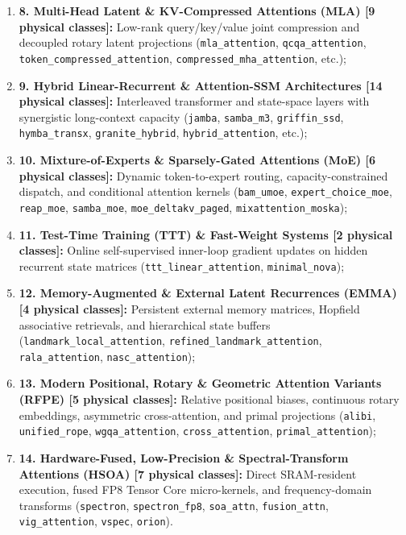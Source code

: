 \begin{enumerate}
    \item \textbf{8. Multi-Head Latent \& KV-Compressed Attentions (MLA) [9 physical classes]:} Low-rank query/key/value joint compression and decoupled rotary latent projections (\texttt{mla\_attention}, \texttt{qcqa\_attention}, \texttt{token\_compressed\_attention}, \texttt{compressed\_mha\_attention}, etc.);
    \item \textbf{9. Hybrid Linear-Recurrent \& Attention-SSM Architectures [14 physical classes]:} Interleaved transformer and state-space layers with synergistic long-context capacity (\texttt{jamba}, \texttt{samba\_m3}, \texttt{griffin\_ssd}, \texttt{hymba\_transx}, \texttt{granite\_hybrid}, \texttt{hybrid\_attention}, etc.);
    \item \textbf{10. Mixture-of-Experts \& Sparsely-Gated Attentions (MoE) [6 physical classes]:} Dynamic token-to-expert routing, capacity-constrained dispatch, and conditional attention kernels (\texttt{bam\_umoe}, \texttt{expert\_choice\_moe}, \texttt{reap\_moe}, \texttt{samba\_moe}, \texttt{moe\_deltakv\_paged}, \texttt{mixattention\_moska});
    \item \textbf{11. Test-Time Training (TTT) \& Fast-Weight Systems [2 physical classes]:} Online self-supervised inner-loop gradient updates on hidden recurrent state matrices (\texttt{ttt\_linear\_attention}, \texttt{minimal\_nova});
    \item \textbf{12. Memory-Augmented \& External Latent Recurrences (EMMA) [4 physical classes]:} Persistent external memory matrices, Hopfield associative retrievals, and hierarchical state buffers (\texttt{landmark\_local\_attention}, \texttt{refined\_landmark\_attention}, \texttt{rala\_attention}, \texttt{nasc\_attention});
    \item \textbf{13. Modern Positional, Rotary \& Geometric Attention Variants (RFPE) [5 physical classes]:} Relative positional biases, continuous rotary embeddings, asymmetric cross-attention, and primal projections (\texttt{alibi}, \texttt{unified\_rope}, \texttt{wgqa\_attention}, \texttt{cross\_attention}, \texttt{primal\_attention});
    \item \textbf{14. Hardware-Fused, Low-Precision \& Spectral-Transform Attentions (HSOA) [7 physical classes]:} Direct SRAM-resident execution, fused FP8 Tensor Core micro-kernels, and frequency-domain transforms (\texttt{spectron}, \texttt{spectron\_fp8}, \texttt{soa\_attn}, \texttt{fusion\_attn}, \texttt{vig\_attention}, \texttt{vspec}, \texttt{orion}).
\end{enumerate}
